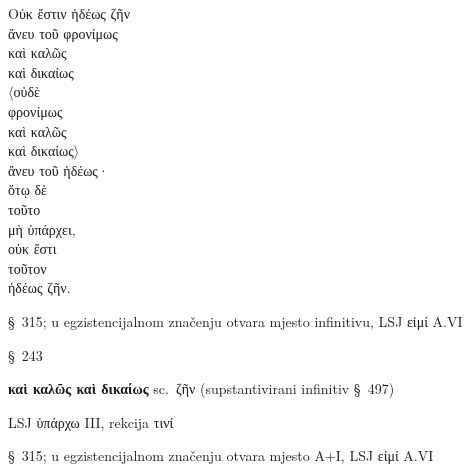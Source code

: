 
{\large
\begin{greek}
\noindent Οὐκ ἔστιν ἡδέως ζῆν \\
ἄνευ τοῦ φρονίμως \\
\tabto{2em} καὶ καλῶς \\
\tabto{2em} καὶ δικαίως \\
$\langle$οὐδὲ \\
\tabto{2em} φρονίμως \\
\tabto{2em} καὶ καλῶς \\
\tabto{2em} καὶ δικαίως$\rangle$\\
ἄνευ τοῦ ἡδέως· \\
ὅτῳ δὲ \\
τοῦτο \\
μὴ ὑπάρχει, \\
\tabto{2em} οὐκ ἔστι \\
\tabto{4em} τοῦτον \\
\tabto{4em} ἡδέως ζῆν.\\

\end{greek}
}

\begin{description}[noitemsep]
\item[Οὐκ ἔστιν] §~315; u egzistencijalnom značenju otvara mjesto infinitivu, LSJ εἰμί A.VI
\item[ζῆν] §~243
\item[τοῦ φρονίμως\dots] \textbf{καὶ καλῶς καὶ δικαίως} sc.\ ζῆν (supstantivirani infinitiv §~497)
\item[ὑπάρχει] LSJ ὑπάρχω III, rekcija τινί
\item[οὐκ ἔστι] §~315; u egzistencijalnom značenju otvara mjesto A+I, LSJ εἰμί A.VI

\end{description}


